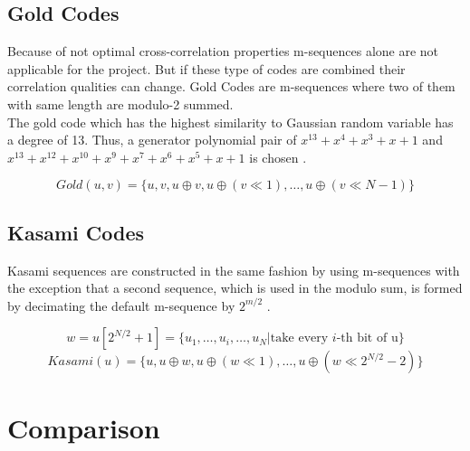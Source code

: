 
\subsection{Gold Codes}

Because of not optimal cross-correlation properties m-sequences alone are not applicable for the project. But if these type of codes are combined their correlation qualities can change. Gold Codes are m-sequences where two of them with same length are modulo-2 summed. \cite{proakis08} \\
The gold code which has the highest similarity to Gaussian random variable has a degree of 13. Thus, a generator polynomial pair of $x^13+x^4+x^3+x+1$ and $x^13+x^12+x^10+x^9+x^7+x^6+x^5+x+1$ is chosen \cite{merrifield} .


\begin{equation}
Gold(u,v)=\{u,v,u\oplus v,u\oplus(v \ll1),\dots,u\oplus(v\ll N-1)\}
\end{equation}


\subsection{Kasami Codes}

Kasami sequences are constructed in the same fashion by using m-sequences with the exception that a second sequence, which is used in the modulo sum, is formed by decimating the default m-sequence by  $2^{m/2}$ \cite{proakis08} \cite{sarwate80} \cite{peterson72}. 

\begin{equation}
w=u[2^{N/2}+1]=\{u_1,\dots, u_i, \dots,u_{N}|\text{take every }i\text{-th bit of u}\} 
\end{equation}
\begin{equation}
Kasami(u)=\{u,u\oplus w,u\oplus(w \ll1),\dots,u\oplus(w\ll2^{N/2}-2)\}
\end{equation}


\section{Comparison}

